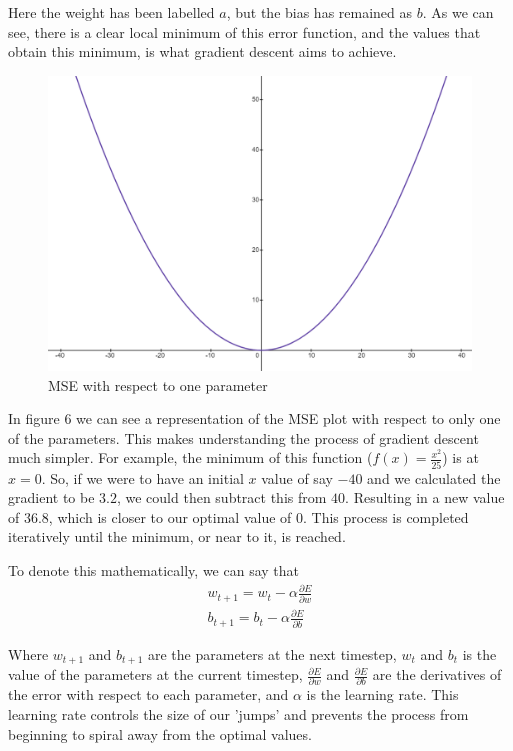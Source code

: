 \documentclass{article}
\begin{document}
    Here the weight has been labelled $a$, but the bias has remained as $b$. As we can see, there is a clear local minimum of this error function,
    and the values that obtain this minimum, is what gradient descent aims to achieve. 
    
    \pagebreak
    \begin{figure}
        \centering
        \includegraphics[scale=0.2]{image.png}
        \caption{MSE with respect to one parameter}
    \end{figure}
    In figure 6 we can see a representation of the MSE plot with respect to only one of the parameters. This makes understanding the process of gradient
    descent much simpler. For example, the minimum of this function ($f(x) = \frac{x^2}{25}$) is at $x = 0$. So, if we were to have an initial $x$ value of say $-40$
    and we calculated the gradient to be $3.2$, we could then subtract this from $40$. Resulting in a new value of $36.8$, which is closer to our optimal value of $0$.
    This process is completed iteratively until the minimum, or near to it, is reached.

    To denote this mathematically, we can say that 
    \begin{align}
        w_{t+1} = w_t - \alpha \frac{\partial E}{\partial w}\\
        b_{t+1} = b_t - \alpha \frac{\partial E}{\partial b}
    \end{align}

    Where $w_{t+1}$ and $b_{t+1}$ are the parameters at the next timestep, $w_t$ and $b_t$ is the value of the parameters at the current timestep, 
    $\frac{\partial E}{\partial w}$ and $\frac{\partial E}{\partial b}$ are the derivatives of the error with respect to each parameter, 
    and $\alpha$ is the learning rate. This learning rate controls the size of our 'jumps' and prevents the process from beginning to spiral away
    from the optimal values.
\end{document}
